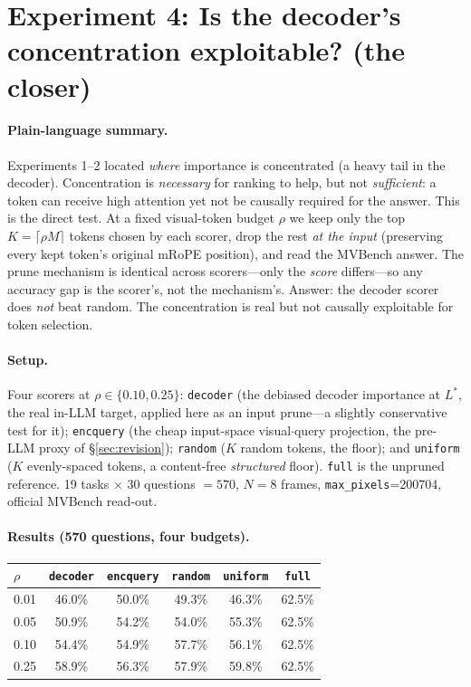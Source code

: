 \documentclass[11pt]{article}
\begin{document}
\section{Experiment 4: Is the decoder's concentration exploitable? (the closer)}

\paragraph{Plain-language summary.}
Experiments 1--2 located \emph{where} importance is concentrated (a heavy tail in the
decoder). Concentration is \emph{necessary} for ranking to help, but not \emph{sufficient}:
a token can receive high attention yet not be causally required for the answer. This is the
direct test. At a fixed visual-token budget $\rho$ we keep only the top
$K=\lceil\rho M\rceil$ tokens chosen by each scorer, drop the rest \emph{at the input}
(preserving every kept token's original mRoPE position), and read the MVBench answer. The
prune mechanism is identical across scorers---only the \emph{score} differs---so any
accuracy gap is the scorer's, not the mechanism's. Answer: the decoder scorer does
\emph{not} beat random. The concentration is real but not causally exploitable for token
selection.

\paragraph{Setup.} Four scorers at $\rho\in\{0.10,0.25\}$: \texttt{decoder} (the debiased
decoder importance at $L^{\!*}$, the real in-LLM target, applied here as an input prune---a
slightly conservative test for it); \texttt{encquery} (the cheap input-space
visual$\cdot$query projection, the pre-LLM proxy of \S\ref{sec:revision}); \texttt{random}
($K$ random tokens, the floor); and \texttt{uniform} ($K$ evenly-spaced tokens, a
content-free \emph{structured} floor). \texttt{full} is the unpruned reference. 19 tasks
$\times$ 30 questions $=570$, $N{=}8$ frames, \texttt{max\_pixels}=200704, official MVBench
read-out.

\paragraph{Results (570 questions, four budgets).}

\begin{center}
\begin{tabular}{lccccc}
\toprule
$\rho$ & \texttt{decoder} & \texttt{encquery} & \texttt{random} & \texttt{uniform} & \texttt{full} \\
\midrule
0.01 & 46.0\% & 50.0\% & 49.3\% & 46.3\% & 62.5\% \\
0.05 & 50.9\% & 54.2\% & 54.0\% & 55.3\% & 62.5\% \\
0.10 & 54.4\% & 54.9\% & 57.7\% & 56.1\% & 62.5\% \\
0.25 & 58.9\% & 56.3\% & 57.9\% & 59.8\% & 62.5\% \\
\bottomrule
\end{tabular}
\end{center}
\end{document}
